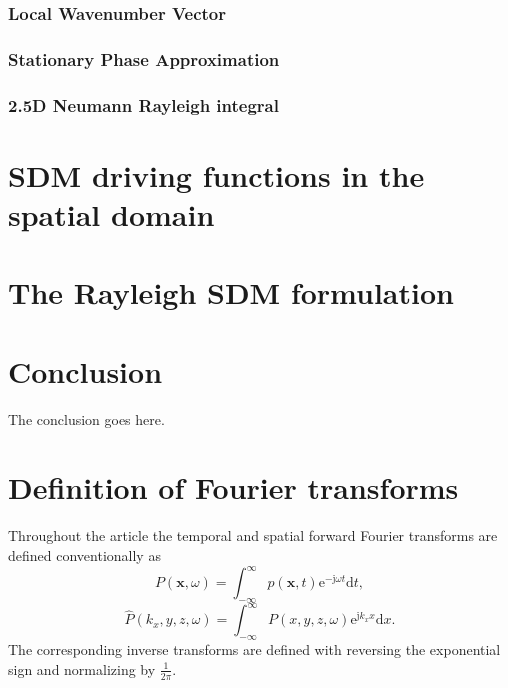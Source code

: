 \documentclass[journal]{IEEEtran}
\newcommand{\td}{\mathrm{d}}
\newcommand{\te}{\mathrm{e}}
\newcommand{\ti}{\mathrm{j}}
\newcommand{\vx}{\mathbf{x}}
\begin{document}
\subsubsection{Local Wavenumber Vector}
\subsubsection{Stationary Phase Approximation}
\subsubsection{2.5D Neumann Rayleigh integral}

\section{SDM driving functions in the spatial domain}

\section{The Rayleigh SDM formulation}


\section{Conclusion}
The conclusion goes here.

\appendices
\section{Definition of Fourier transforms}
\label{sec:App_A_Fourier_tr}
Throughout the article the temporal and spatial forward Fourier transforms are defined conventionally as
\begin{equation}
P(\vx,\omega) = \int_{-\infty}^{\infty} p(\vx,t) \te^{-\ti \omega t} \td t,
\end{equation}
\begin{equation}
\hat{P}(k_x,y,z,\omega) = \int_{-\infty}^{\infty} P(x,y,z,\omega) \te^{\ti k_x x} \td x.
\end{equation}
The corresponding inverse transforms are defined with reversing the exponential sign and normalizing by $\frac{1}{2\pi}$.


\ifCLASSOPTIONcaptionsoff
  \newpage
\fi



%
%
\end{document}
